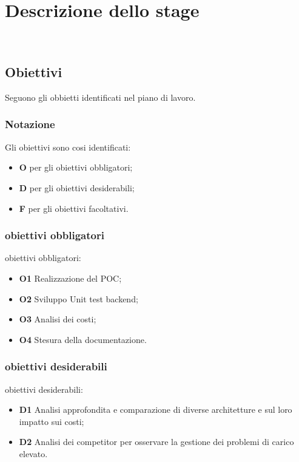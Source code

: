 \chapter{Descrizione dello stage}
\\
\label{cap:descrizione-stage}
\section{Obiettivi}
\label{sec:obiettivi}
Seguono gli obbietti identificati nel piano di lavoro.
\subsection{Notazione}
\label{subsec:notazione}
Gli obiettivi sono cosi identificati:
\begin{itemize}
    \item \textbf{O} per gli obiettivi obbligatori;
    \item \textbf{D} per gli obiettivi desiderabili;
    \item \textbf{F} per gli obiettivi facoltativi.
\end{itemize}
\subsection{obiettivi obbligatori}
obiettivi obbligatori:
\begin{itemize}
    \item \textbf{O1} Realizzazione del POC;
    \item \textbf{O2} Sviluppo Unit test backend;
    \item \textbf{O3} Analisi dei costi;
    \item \textbf{O4} Stesura della documentazione.
\end{itemize}
\subsection{obiettivi desiderabili}
obiettivi desiderabili:
\begin{itemize}
    \item \textbf{D1} Analisi approfondita e comparazione di diverse architetture e sul loro impatto sui costi;
    \item \textbf{D2} Analisi dei competitor per osservare la gestione dei problemi di carico elevato.
\end{itemize}

